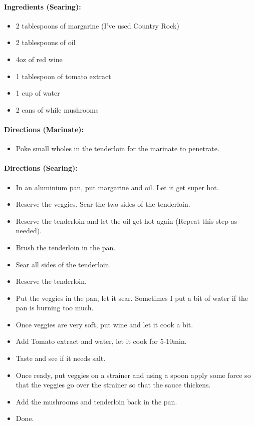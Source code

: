 \documentclass{article}
\begin{document}
\paragraph{Ingredients (Searing):}
\begin{itemize}
    \item 2 tablespoons of margarine (I've used Country Rock)
    \item 2 tablespoons of oil
    \item 4oz of red wine
    \item 1 tablespoon of tomato extract
    \item 1 cup of water
    \item 2 cans of while mushrooms
\end{itemize}  

\paragraph{Directions (Marinate):}
\begin{itemize}
    \item Poke small wholes in the tenderloin for the marinate to penetrate.
\end{itemize}  

\paragraph{Directions (Searing):}
\begin{itemize}
    \item In an aluminium pan, put margarine and oil. Let it get super hot.
    \item Reserve the veggies. Sear the two sides of the tenderloin.
    \item Reserve the tenderloin and let the oil get hot again (Repeat this step as needed).
    \item Brush the tenderloin in the pan.
    \item Sear all sides of the tenderloin.
    \item Reserve the tenderloin.
    \item Put the veggies in the pan, let it sear. Sometimes I put a bit of water if the pan is burning too much.
    \item Once veggies are very soft, put wine and let it cook a bit.
    \item Add Tomato extract and water, let it cook for 5-10min.
    \item Taste and see if it needs salt.
    \item Once ready, put veggies on a strainer and using a spoon apply some force so that the veggies go over the strainer so that the sauce thickens.
    \item Add the mushrooms and tenderloin back in the pan.
    \item Done.
\end{itemize} 
\end{document}
